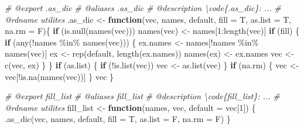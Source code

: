 \documentclass[
]{article}
\newenvironment{Shaded}{\begin{snugshade}}{\end{snugshade}}
\newcommand{\AttributeTok}[1]{\textcolor[rgb]{0.77,0.63,0.00}{#1}}
\newcommand{\CommentTok}[1]{\textcolor[rgb]{0.56,0.35,0.01}{\textit{#1}}}
\newcommand{\ControlFlowTok}[1]{\textcolor[rgb]{0.13,0.29,0.53}{\textbf{#1}}}
\newcommand{\DecValTok}[1]{\textcolor[rgb]{0.00,0.00,0.81}{#1}}
\newcommand{\FunctionTok}[1]{\textcolor[rgb]{0.00,0.00,0.00}{#1}}
\newcommand{\NormalTok}[1]{#1}
\newcommand{\OtherTok}[1]{\textcolor[rgb]{0.56,0.35,0.01}{#1}}
\newcommand{\SpecialCharTok}[1]{\textcolor[rgb]{0.00,0.00,0.00}{#1}}
\begin{document}
\begin{Shaded}
\begin{Highlighting}[]
\CommentTok{\#\textquotesingle{} @export .as\_dic}
\CommentTok{\#\textquotesingle{} @aliases .as\_dic}
\CommentTok{\#\textquotesingle{} @description \textbackslash{}code\{.as\_dic\}: ...}
\CommentTok{\#\textquotesingle{} @rdname utilites}
\NormalTok{.as\_dic }\OtherTok{\textless{}{-}} 
  \ControlFlowTok{function}\NormalTok{(vec, names, default,}
           \AttributeTok{fill =}\NormalTok{ T, }\AttributeTok{as.list =}\NormalTok{ T, }\AttributeTok{na.rm =}\NormalTok{ F)\{}
    \ControlFlowTok{if}\NormalTok{ (}\FunctionTok{is.null}\NormalTok{(}\FunctionTok{names}\NormalTok{(vec)))}
      \FunctionTok{names}\NormalTok{(vec) }\OtherTok{\textless{}{-}}\NormalTok{ names[}\DecValTok{1}\SpecialCharTok{:}\FunctionTok{length}\NormalTok{(vec)]}
    \ControlFlowTok{if}\NormalTok{ (fill) \{}
      \ControlFlowTok{if}\NormalTok{ (}\FunctionTok{any}\NormalTok{(}\SpecialCharTok{!}\NormalTok{names }\SpecialCharTok{\%in\%} \FunctionTok{names}\NormalTok{(vec))) \{}
\NormalTok{        ex.names }\OtherTok{\textless{}{-}}\NormalTok{ names[}\SpecialCharTok{!}\NormalTok{names }\SpecialCharTok{\%in\%} \FunctionTok{names}\NormalTok{(vec)]}
\NormalTok{        ex }\OtherTok{\textless{}{-}} \FunctionTok{rep}\NormalTok{(default, }\FunctionTok{length}\NormalTok{(ex.names))}
        \FunctionTok{names}\NormalTok{(ex) }\OtherTok{\textless{}{-}}\NormalTok{ ex.names}
\NormalTok{        vec }\OtherTok{\textless{}{-}} \FunctionTok{c}\NormalTok{(vec, ex)}
\NormalTok{      \}}
\NormalTok{    \}}
    \ControlFlowTok{if}\NormalTok{ (as.list) \{}
      \ControlFlowTok{if}\NormalTok{ (}\SpecialCharTok{!}\FunctionTok{is.list}\NormalTok{(vec))}
\NormalTok{        vec }\OtherTok{\textless{}{-}} \FunctionTok{as.list}\NormalTok{(vec)}
\NormalTok{    \}}
    \ControlFlowTok{if}\NormalTok{ (na.rm) \{}
\NormalTok{      vec }\OtherTok{\textless{}{-}}\NormalTok{ vec[}\SpecialCharTok{!}\FunctionTok{is.na}\NormalTok{(}\FunctionTok{names}\NormalTok{(vec))]}
\NormalTok{    \}}
\NormalTok{    vec}
\NormalTok{  \}}

\CommentTok{\#\textquotesingle{} @export fill\_list}
\CommentTok{\#\textquotesingle{} @aliases fill\_list}
\CommentTok{\#\textquotesingle{} @description \textbackslash{}code\{fill\_list\}: ...}
\CommentTok{\#\textquotesingle{} @rdname utilites}
\NormalTok{fill\_list }\OtherTok{\textless{}{-}} \ControlFlowTok{function}\NormalTok{(names, vec, }\AttributeTok{default =}\NormalTok{ vec[}\DecValTok{1}\NormalTok{]) \{}
  \FunctionTok{.as\_dic}\NormalTok{(vec, names, default, }\AttributeTok{fill =}\NormalTok{ T, }\AttributeTok{as.list =}\NormalTok{ F, }\AttributeTok{na.rm =}\NormalTok{ F)}
\NormalTok{\}}


\end{Highlighting}
\end{Shaded}
\end{document}
